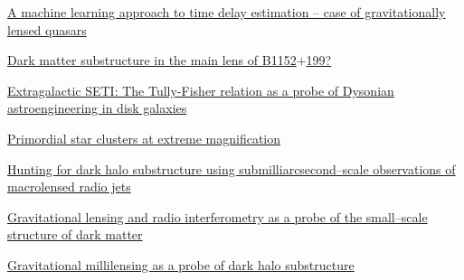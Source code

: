 
  \begin{cvitems}
    \vspace{.5\baselineskip}

    \item \small{\href{https://github.com/asadisaghar/TimeDelay}{ A
    machine learning approach to time delay estimation -- case of
    gravitationally lensed quasars}}

    \item \small{\href{https://github.com/asadisaghar/B1152199}{ Dark
    matter substructure in the main lens of B1152$+$199?}}

    \item \href{http://iopscience.iop.org/article/10.1088/0004-637X/810/1/23/meta}{ Extragalactic
    SETI: The Tully-Fisher relation as a probe of Dysonian
    astroengineering in disk galaxies }

    \item \href{http://mnras.oxfordjournals.org/content/449/3/3057}{
    Primordial star clusters at extreme magnification }

    \item \small{\href{http://mnras.oxfordjournals.org/content/431/3/2172}{Hunting
    for dark halo substructure using submilliarcsecond--scale
    observations of macrolensed radio jets}}

    \item \small{\href{http://asadisaghar.github.io/Licentiate-thesis/}{Gravitational
    lensing and radio interferometry as a probe of the small--scale
    structure of dark matter}}

    \item \small{\href{http://asadisaghar.github.io/MSc-thesis/}{Gravitational
    millilensing as a probe of dark halo substructure}}

  \end{cvitems}
